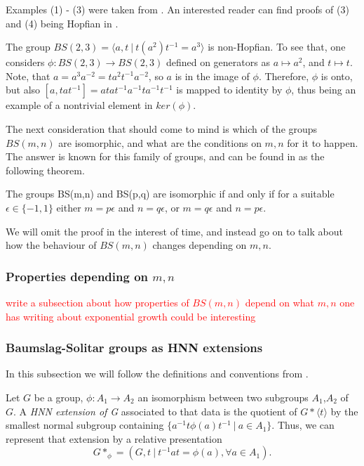 Examples (1) - (3) were taken from \cite{CeSi23}. An interested reader can find proofs of (3) and (4) being Hopfian in \cite[~chapters I, IV]{LySch15}. 

\begin{importantexample}\cite[page 514]{BrHa11}
    The group $BS(2,3) = \langle a,t \: | \: t(a^2)t^{-1} = a^3\rangle $ is non-Hopfian. To see that, one considers $\phi: BS(2,3) \to BS(2,3)$ defined on generators as $a \mapsto a^2$, and $t \mapsto t$. Note, that $a = a^3a^{-2} = ta^2t^{-1}a^{-2}$, so $a$ is in the image of $\phi$. Therefore, $\phi$ is onto, but also $[a,tat^{-1}] = atat^{-1}a^{-1}ta^{-1}t^{-1}$ is mapped to identity by $\phi$, thus being an example of a nontrivial element in $ker(\phi)$.
\end{importantexample}

The next consideration that should come to mind is which of the groups $BS(m,n)$ are isomorphic, and what are the conditions on $m,n$ for it to happen. The answer is known for this family of groups, and can be found in \cite{Mol91} as the following theorem.

\begin{theorem}
    The groups BS(m,n) and BS(p,q) are isomorphic if and only if for a suitable $\epsilon \in \{-1,1\}$ either $m = p\epsilon$ and $n = q\epsilon$, or $m = q\epsilon$ and $n = p\epsilon$.
\end{theorem}

We will omit the proof in the interest of time, and instead go on to talk about how the behaviour of $BS(m,n)$ changes depending on $m,n$.

\subsubsection{Properties depending on $m,n$}
\textcolor{red}{write a subsection about how properties of $BS(m,n)$ depend on what $m,n$ one has}
\textcolor{red}{writing about exponential growth could be interesting}

\subsubsection{Baumslag-Solitar groups as HNN extensions}

In this subsection we will follow the definitions and conventions from \cite[pages 497-498]{BrHa11}.

\begin{definition}
\label{HNN}
    Let $G$ be a group, $\phi: A_1 \to A_2$ an isomorphism between two subgroups $A_1$,$A_2$ of $G$. A \emph{HNN extension of G} associated to that data is the quotient of $G \ast \langle t \rangle$ by the smallest normal subgroup containing $\{a^{-1}t\phi(a)t^{-1} \: | \: a \in A_1 \}$. Thus, we can represent that extension by a relative presentation 
    \[G \ast_\phi = ( G,t \: | \: t^{-1}at = \phi(a), \forall a \in A_1). \]
\end{definition}

